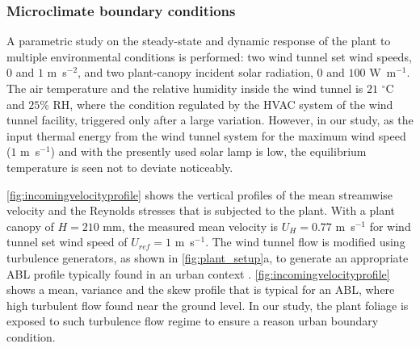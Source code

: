 \subsubsection*{Microclimate boundary conditions}
A parametric study on the steady-state and dynamic response of the plant to multiple environmental conditions is performed: two wind tunnel set wind speeds, $0$ and $1$ m~s$^{-2}$, and two plant-canopy incident solar radiation, $0$ and $100$ W~m$^{-1}$. The air temperature and the relative humidity inside the wind tunnel is $21$ $^{\circ}$C and $25$\% RH, where the condition regulated by the HVAC system of the wind tunnel facility, triggered only after a large variation. However, in our study, as the input thermal energy from the wind tunnel system for the maximum wind speed ($1$ m~s$^{-1}$) and with the presently used solar lamp is low, the equilibrium temperature is seen not to deviate noticeably. 

\cref{fig:incomingvelocityprofile} shows the vertical profiles of the mean streamwise velocity and the Reynolds stresses that is subjected to the plant. With a plant canopy of $H=210$ mm, the measured mean velocity is $U_H=0.77$ m~s$^{-1}$ for wind tunnel set wind speed of $U_{ref}=1$ m~s$^{-1}$. The wind tunnel flow is modified using turbulence generators, as shown in \cref{fig:plant_setup}a, to generate an appropriate ABL profile typically found in an urban context \citep{Tsalicoglou2018}. \cref{fig:incomingvelocityprofile} shows a mean, variance and the skew profile that is typical for an ABL, where high turbulent flow found near the ground level. In our study, the plant foliage is exposed to such turbulence flow regime to ensure a reason urban boundary condition.

